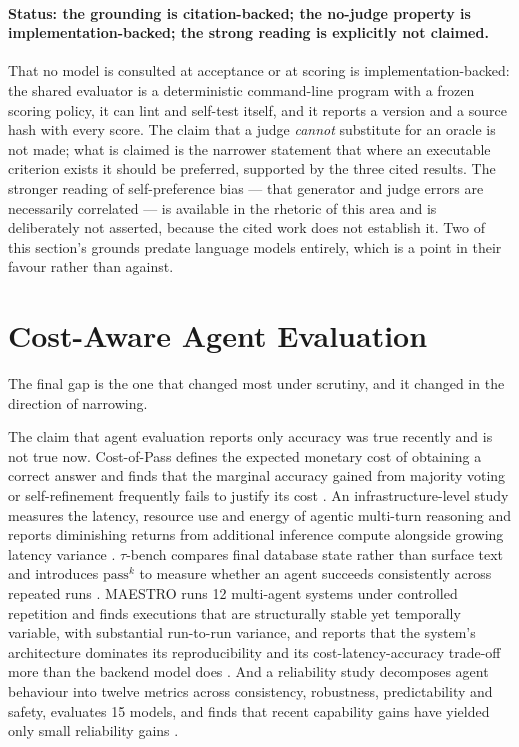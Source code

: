 \paragraph{Status: the grounding is citation-backed; the no-judge property is
implementation-backed; the strong reading is explicitly not claimed.}
That no model is consulted at acceptance or at scoring is implementation-backed: the shared
evaluator is a deterministic command-line program with a frozen scoring policy, it can lint and
self-test itself, and it reports a version and a source hash with every score. The claim that a
judge \emph{cannot} substitute for an oracle is not made; what is claimed is the narrower
statement that where an executable criterion exists it should be preferred, supported by the
three cited results. The stronger reading of self-preference bias --- that generator and judge
errors are necessarily correlated --- is available in the rhetoric of this area and is
deliberately not asserted, because the cited work does not establish it. Two of this section's
grounds predate language models entirely, which is a point in their favour rather than against.

\section{Cost-Aware Agent Evaluation}
\label{sec:rel:evaluation}

The final gap is the one that changed most under scrutiny, and it changed in the direction of
narrowing.

The claim that agent evaluation reports only accuracy was true recently and is not true now.
Cost-of-Pass defines the expected monetary cost of obtaining a correct answer and finds that
the marginal accuracy gained from majority voting or self-refinement frequently fails to justify
its cost \cite{erol2025costofpass}. An infrastructure-level study measures the latency, resource
use and energy of agentic multi-turn reasoning and reports diminishing returns from additional
inference compute alongside growing latency variance \cite{kim2026dynamicreasoning}.
$\tau$-bench compares final database state rather than surface text and introduces $\mathrm{pass}^k$
to measure whether an agent succeeds consistently across repeated runs \cite{yao2025taubench}.
MAESTRO runs 12 multi-agent systems under controlled repetition and finds executions that are
structurally stable yet temporally variable, with substantial run-to-run variance, and reports
that the system's architecture dominates its reproducibility and its cost-latency-accuracy
trade-off more than the backend model does \cite{ma2026maestro}. And a reliability study
decomposes agent behaviour into twelve metrics across consistency, robustness, predictability
and safety, evaluates 15 models, and finds that recent capability gains have yielded only small
reliability gains \cite{rabanser2026reliability}.

